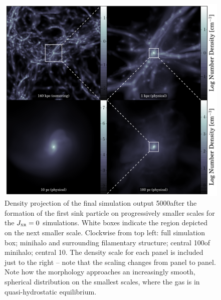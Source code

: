 \documentclass[../thesis.tex]{subfiles}
\begin{document}
\begin{figure}
  \begin{center}
    \includegraphics[width=\textwidth]{figures/structure/structure-vanilla_t0}
    \caption{Density projection of the final simulation output 5000\yr after the formation of the first sink particle on progressively smaller scales for the $J_{\textsc{xr}}=0$ simulations.  White boxes indicate the region depicted on the next smaller scale.  Clockwise from top left: full simulation box; minihalo and surrounding filamentary structure; central 100\pc of minihalo; central 10\pc.  The density scale for each panel is included just to the right -- note that the scaling changes from panel to panel. Note how the morphology approaches an increasingly smooth, spherical distribution on the smallest scales, where the gas is in quasi-hydrostatic equilibrium.}
    \label{zoom-in}
  \end{center}
\end{figure}
\end{document}
